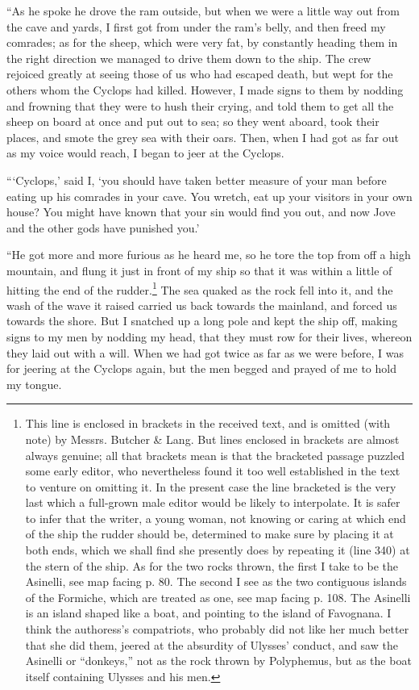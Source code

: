 “As he spoke he drove the ram outside, but when we were a little way out from
the cave and yards, I first got from under the ram’s belly, and then freed my
comrades; as for the sheep, which were very fat, by constantly heading them in
the right direction we managed to drive them down to the ship. The crew
rejoiced greatly at seeing those of us who had escaped death, but wept for the
others whom the Cyclops had killed. However, I made signs to them by nodding
and frowning that they were to hush their crying, and told them to get all the
sheep on board at once and put out to sea; so they went aboard, took their
places, and smote the grey sea with their oars. Then, when I had got as far out
as my voice would reach, I began to jeer at the Cyclops.

“‘Cyclops,’ said I, ‘you should have taken better measure of your man before
eating up his comrades in your cave. You wretch, eat up your visitors in your
own house? You might have known that your sin would find you out, and now Jove
and the other gods have punished you.’

“He got more and more furious as he heard me, so he tore the top from off a
high mountain, and flung it just in front of my ship so that it was within a
little of hitting the end of the rudder.\footnote{This line is enclosed in brackets in the received text, and is omitted (with
note) by Messrs. Butcher \& Lang. But lines enclosed in brackets are almost
always genuine; all that brackets mean is that the bracketed passage puzzled
some early editor, who nevertheless found it too well established in the text
to venture on omitting it. In the present case the line bracketed is the very
last which a full-grown male editor would be likely to interpolate. It is
safer to infer that the writer, a young woman, not knowing or caring at which
end of the ship the rudder should be, determined to make sure by placing it at
both ends, which we shall find she presently does by repeating it (line 340)
at the stern of the ship. As for the two rocks thrown, the first I take to be
the Asinelli, see map facing p. 80. The second I see as the two contiguous
islands of the Formiche, which are treated as one, see map facing p. 108. The
Asinelli is an island shaped like a boat, and pointing to the island of
Favognana. I think the authoress’s compatriots, who probably did not like her
much better that she did them, jeered at the absurdity of Ulysses’ conduct,
and saw the Asinelli or “donkeys,” not as the rock thrown by Polyphemus, but
as the boat itself containing Ulysses and his men.} The sea quaked as the rock fell into
it, and the wash of the wave it raised carried us back towards the mainland,
and forced us towards the shore. But I snatched up a long pole and kept the
ship off, making signs to my men by nodding my head, that they must row for
their lives, whereon they laid out with a will. When we had got twice as far as
we were before, I was for jeering at the Cyclops again, but the men begged and
prayed of me to hold my tongue.

